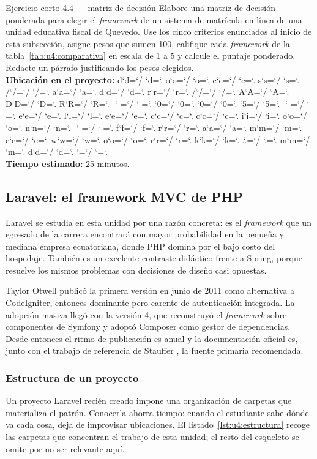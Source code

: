 \documentclass[11pt,a4paper,openany]{book}
\newcommand{\ruta}[1]{{\ttfamily\small\rutaaux #1\relax}}
\def\rutaaux{\futurelet\next\rutapaso}
\def\rutapaso{%
	\ifx\next\relax \let\sig\relax
	\else \let\sig\rutaimprime \fi \sig}
\def\rutaimprime#1{%
	#1\ifnum`#1=`/ \allowbreak\fi
	\ifnum`#1=`. \allowbreak\fi
	\rutaaux}
\begin{document}
\begin{cajaejercicio}{Ejercicio corto 4.4 --- matriz de decisión}
	Elabore una matriz de decisión ponderada para elegir el \emph{framework} de un sistema de matrícula en línea de una unidad educativa fiscal de Quevedo. Use los cinco criterios enunciados al inicio de esta subsección, asigne pesos que sumen 100, califique cada \emph{framework} de la tabla~\ref{tab:u4:comparativa} en escala de 1 a 5 y calcule el puntaje ponderado. Redacte un párrafo justificando los pesos elegidos.\\[3pt]
	\textbf{Ubicación en el proyecto:} \ruta{docs/adr/ADR-005-eleccion-framework.md}\\[3pt]
	\textbf{Tiempo estimado:} 25 minutos.
\end{cajaejercicio}

\subsection{Laravel: el framework MVC de PHP}
\label{sec:u4:laravel}

Laravel se estudia en esta unidad por una razón concreta: es el \emph{framework} que un egresado de la carrera encontrará con mayor probabilidad en la pequeña y mediana empresa ecuatoriana, donde PHP domina por el bajo costo del hospedaje. También es un excelente contraste didáctico frente a Spring, porque resuelve los mismos problemas con decisiones de diseño casi opuestas.

Taylor Otwell publicó la primera versión en junio de 2011 como alternativa a CodeIgniter, entonces dominante pero carente de autenticación integrada. La adopción masiva llegó con la versión 4, que reconstruyó el \emph{framework} sobre componentes de Symfony y adoptó Composer como gestor de dependencias. Desde entonces el ritmo de publicación es anual y la documentación oficial es, junto con el trabajo de referencia de Stauffer \cite{stauffer2023laravel}, la fuente primaria recomendada.

\subsubsection{Estructura de un proyecto}

Un proyecto Laravel recién creado impone una organización de carpetas que materializa el patrón. Conocerla ahorra tiempo: cuando el estudiante sabe dónde va cada cosa, deja de improvisar ubicaciones. El listado~\ref{lst:u4:estructura} recoge las carpetas que concentran el trabajo de esta unidad; el resto del esqueleto se omite por no ser relevante aquí.
\end{document}
